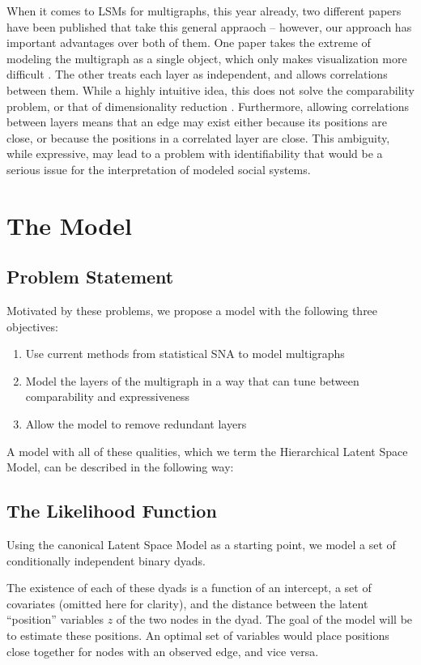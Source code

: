 \documentclass{article}
\begin{document}
When it comes to LSMs for multigraphs, this year already, two different papers have been published that take this general appraoch -- however, our approach has important advantages over both of them. One paper takes the extreme of modeling the multigraph as a single object, which only makes visualization more difficult \cite{gollini-2016}. The other treats each layer as independent, and allows correlations between them. While a highly intuitive idea, this does not solve the comparability problem, or that of dimensionality reduction \cite{salter-townshend2017}. Furthermore, allowing correlations between layers means that an edge may exist either because its positions are close, or because the positions in a correlated layer are close. This ambiguity, while expressive, may lead to a problem with identifiability that would be a serious issue for the interpretation of modeled social systems. %

\section{The Model}
\subsection{Problem Statement}
Motivated by these problems, we propose a model with the following three objectives:

\begin{enumerate}
\item Use current methods from statistical SNA to model multigraphs
\item Model the layers of the multigraph in a way that can tune between comparability and expressiveness
\item Allow the model to remove redundant layers
\end{enumerate}

A model with all of these qualities, which we term the Hierarchical Latent Space Model, can be described in the following way:

\subsection{The Likelihood Function}
Using the canonical Latent Space Model \cite{Hoff2002} as a starting point, we model a set of conditionally independent binary dyads. 

The existence of each of these dyads is a function of an intercept, a set of covariates (omitted here for clarity), and the distance between the latent ``position'' variables $z$ of the two nodes in the dyad. The goal of the model will be to estimate these positions. An optimal set of variables would place positions close together for nodes with an observed edge, and vice versa.
\end{document}

